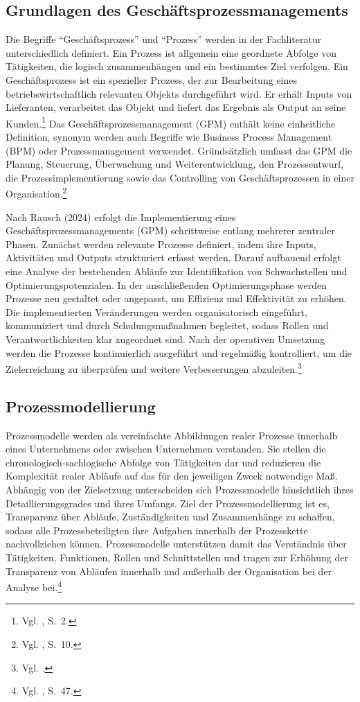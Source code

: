 \documentclass[
    12pt, 
    a4paper,
    ]{scrartcl} %
\begin{document}
\subsection{Grundlagen des Geschäftsprozessmanagements}
Die Begriffe \enquote{Geschäftsprozess} und \enquote{Prozess} werden in der Fachliteratur unterschiedlich definiert. Ein Prozess ist allgemein eine geordnete Abfolge von Tätigkeiten, die logisch zusammenhängen und ein bestimmtes Ziel verfolgen. Ein Geschäftsprozess ist ein spezieller Prozess, der zur Bearbeitung eines betriebswirtschaftlich relevanten Objekts durchgeführt wird. Er erhält Inputs von Lieferanten, verarbeitet das Objekt und liefert das Ergebnis als Output an seine Kunden.\footnote{Vgl. \cite{Koch_Geschaeftsprozessmanagement}, S.~2.} Das Geschäftsprozessmanagement (GPM) enthält keine einheitliche Definition, synonym werden auch Begriffe wie Business Process Management (BPM) oder Prozessmanagement verwendet. Gründsätzlich umfasst das GPM die Planung, Steuerung, Überwachung und Weiterentwicklung, den Prozessentwurf, die Prozessimplementierung sowie das Controlling von Geschäftsprozessen in einer Organisation.\footnote{Vgl. \cite{Koch_Geschaeftsprozessmanagement}, S.~10.}

Nach Rausch (2024) erfolgt die Implementierung eines Geschäftsprozessmanagements (GPM) schrittweise entlang mehrerer zentraler Phasen. Zunächst werden relevante Prozesse definiert, indem ihre Inputs, Aktivitäten und Outputs strukturiert erfasst werden. Darauf aufbauend erfolgt eine Analyse der bestehenden Abläufe zur Identifikation von Schwachstellen und Optimierungspotenzialen. In der anschließenden Optimierungsphase werden Prozesse neu gestaltet oder angepasst, um Effizienz und Effektivität zu erhöhen. Die implementierten Veränderungen werden organisatorisch eingeführt, kommuniziert und durch Schulungsmaßnahmen begleitet, sodass Rollen und Verantwortlichkeiten klar zugeordnet sind. Nach der operativen Umsetzung werden die Prozesse kontinuierlich ausgeführt und regelmäßig kontrolliert, um die Zielerreichung zu überprüfen und weitere Verbesserungen abzuleiten.\footnote{Vgl. \cite{Boc_Group}.}

\subsection{Prozessmodellierung}
Prozessmodelle werden als vereinfachte Abbildungen realer Prozesse innerhalb eines Unternehmens oder zwischen Unternehmen verstanden. Sie stellen die chronologisch-sachlogische Abfolge von Tätigkeiten dar und reduzieren die Komplexität realer Abläufe auf das für den jeweiligen Zweck notwendige Maß. Abhängig von der Zielsetzung unterscheiden sich Prozessmodelle hinsichtlich ihres Detaillierungsgrades und ihres Umfangs. Ziel der Prozessmodellierung ist es, Transparenz über Abläufe, Zuständigkeiten und Zusammenhänge zu schaffen, sodass alle Prozessbeteiligten ihre Aufgaben innerhalb der Prozesskette nachvollziehen können. Prozessmodelle unterstützen damit das Verständnis über Tätigkeiten, Funktionen, Rollen und Schnittstellen und tragen zur Erhöhung der Transparenz von Abläufen innerhalb und außerhalb der Organisation bei der Analyse bei.\footnote{Vgl. \cite{Koch_Geschaeftsprozessmanagement}, S.~47.}
\end{document}
